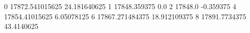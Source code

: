 0 17872.541015625 24.181640625
1 17848.359375 0.0
2 17848.0 -0.359375
4 17854.41015625 6.05078125
6 17867.271484375 18.912109375
8 17891.7734375 43.4140625
